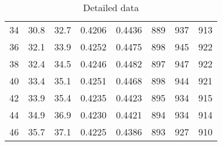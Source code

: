 \begin{table}[!htb]
\begin{tabular}{cccccccc}
		34 & 30.8 & 32.7 & 0.4206 & 0.4436 & 889  & 937  & 913  \\
		36 & 32.1 & 33.9 & 0.4252 & 0.4475 & 898  & 945  & 922  \\
		38 & 32.4 & 34.5 & 0.4246 & 0.4482 & 897  & 947  & 922  \\
		40 & 33.4 & 35.1 & 0.4251 & 0.4468 & 898  & 944  & 921  \\
		42 & 33.9 & 35.4 & 0.4235 & 0.4423 & 895  & 934  & 915  \\
		44 & 34.9 & 36.9 & 0.4230 & 0.4421 & 894  & 934  & 914  \\
		46 & 35.7 & 37.1 & 0.4225 & 0.4386 & 893  & 927  & 910  \\
        \end{tabular}
        \caption{Detailed data}\label{tab:data}
\end{table}


